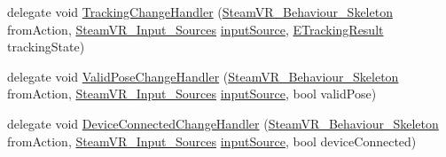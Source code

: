 \begin{DoxyCompactItemize}
\item 
delegate void \mbox{\hyperlink{class_valve_1_1_v_r_1_1_steam_v_r___behaviour___skeleton_a473b611af60d6c89ba50e62833c23cd8}{Tracking\+Change\+Handler}} (\mbox{\hyperlink{class_valve_1_1_v_r_1_1_steam_v_r___behaviour___skeleton}{Steam\+V\+R\+\_\+\+Behaviour\+\_\+\+Skeleton}} from\+Action, \mbox{\hyperlink{namespace_valve_1_1_v_r_a82e5bf501cc3aa155444ee3f0662853f}{Steam\+V\+R\+\_\+\+Input\+\_\+\+Sources}} \mbox{\hyperlink{class_valve_1_1_v_r_1_1_steam_v_r___behaviour___skeleton_a794d8178d3505640a8ec6183d8807221}{input\+Source}}, \mbox{\hyperlink{namespace_valve_1_1_v_r_abe6feab98f33191b7c27b4292012e90a}{E\+Tracking\+Result}} tracking\+State)
\item 
delegate void \mbox{\hyperlink{class_valve_1_1_v_r_1_1_steam_v_r___behaviour___skeleton_a8fe9b3915e182d4b7b731a6ef858eb9e}{Valid\+Pose\+Change\+Handler}} (\mbox{\hyperlink{class_valve_1_1_v_r_1_1_steam_v_r___behaviour___skeleton}{Steam\+V\+R\+\_\+\+Behaviour\+\_\+\+Skeleton}} from\+Action, \mbox{\hyperlink{namespace_valve_1_1_v_r_a82e5bf501cc3aa155444ee3f0662853f}{Steam\+V\+R\+\_\+\+Input\+\_\+\+Sources}} \mbox{\hyperlink{class_valve_1_1_v_r_1_1_steam_v_r___behaviour___skeleton_a794d8178d3505640a8ec6183d8807221}{input\+Source}}, bool valid\+Pose)
\item 
delegate void \mbox{\hyperlink{class_valve_1_1_v_r_1_1_steam_v_r___behaviour___skeleton_aa05646483bd740b42ea2455f964f9cf7}{Device\+Connected\+Change\+Handler}} (\mbox{\hyperlink{class_valve_1_1_v_r_1_1_steam_v_r___behaviour___skeleton}{Steam\+V\+R\+\_\+\+Behaviour\+\_\+\+Skeleton}} from\+Action, \mbox{\hyperlink{namespace_valve_1_1_v_r_a82e5bf501cc3aa155444ee3f0662853f}{Steam\+V\+R\+\_\+\+Input\+\_\+\+Sources}} \mbox{\hyperlink{class_valve_1_1_v_r_1_1_steam_v_r___behaviour___skeleton_a794d8178d3505640a8ec6183d8807221}{input\+Source}}, bool device\+Connected)
\end{DoxyCompactItemize}
